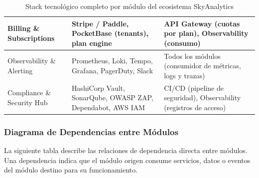 ﻿\documentclass[11pt, letterpaper]{article}
\begin{document}
\begin{table}[H]
\begin{tabularx}{\linewidth}{>{\raggedright\arraybackslash}p{2.8cm} >{\raggedright\arraybackslash}p{5.2cm} >{\raggedright\arraybackslash}X}
\midrule

Billing \& Subscriptions & Stripe / Paddle, PocketBase (tenants), plan engine & API Gateway (cuotas por plan), Observability (consumo) \\

\midrule

Observability \& Alerting & Prometheus, Loki, Tempo, Grafana, PagerDuty, Slack & Todos los módulos (consumidor de métricas, logs y trazas) \\

\midrule

Compliance \& Security Hub & HashiCorp Vault, SonarQube, OWASP ZAP, Dependabot, AWS IAM & CI/CD (pipeline de seguridad), Observability (registros de acceso) \\

\bottomrule

\end{tabularx}

\caption{Stack tecnológico completo por módulo del ecosistema SkyAnalytics}

\end{table}




\subsubsection{Diagrama de Dependencias entre Módulos}



La siguiente tabla describe las relaciones de dependencia directa entre módulos. Una dependencia indica que el módulo origen consume servicios, datos o eventos del módulo destino para su funcionamiento.
\end{document}
